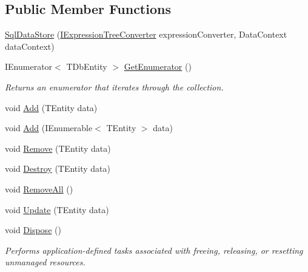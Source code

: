 \subsection*{Public Member Functions}
\begin{DoxyCompactItemize}
\item 
\hyperlink{classCqrs_1_1Sql_1_1DataStores_1_1SqlDataStore_a3ddc911126acbde0353e7773ddfa8acc}{Sql\+Data\+Store} (\hyperlink{interfaceCqrs_1_1Sql_1_1DataStores_1_1IExpressionTreeConverter}{I\+Expression\+Tree\+Converter} expression\+Converter, Data\+Context data\+Context)
\item 
I\+Enumerator$<$ T\+Db\+Entity $>$ \hyperlink{classCqrs_1_1Sql_1_1DataStores_1_1SqlDataStore_a2114238ed13dfe1beaf1b096d3e36c6a}{Get\+Enumerator} ()
\begin{DoxyCompactList}\small\item\em Returns an enumerator that iterates through the collection. \end{DoxyCompactList}\item 
void \hyperlink{classCqrs_1_1Sql_1_1DataStores_1_1SqlDataStore_a715ab041546e864cb9551d165c240f33}{Add} (T\+Entity data)
\item 
void \hyperlink{classCqrs_1_1Sql_1_1DataStores_1_1SqlDataStore_a510fc3eafe64f999b99290cd8924a00e}{Add} (I\+Enumerable$<$ T\+Entity $>$ data)
\item 
void \hyperlink{classCqrs_1_1Sql_1_1DataStores_1_1SqlDataStore_ada15bdc873b3e4be8ff9a734d84562fb}{Remove} (T\+Entity data)
\item 
void \hyperlink{classCqrs_1_1Sql_1_1DataStores_1_1SqlDataStore_a5065ed1d4b5c66324afcde4acc68ad6b}{Destroy} (T\+Entity data)
\item 
void \hyperlink{classCqrs_1_1Sql_1_1DataStores_1_1SqlDataStore_a5d85a9e627c74a25ef536364a6d60602}{Remove\+All} ()
\item 
void \hyperlink{classCqrs_1_1Sql_1_1DataStores_1_1SqlDataStore_a5cc26a4d03036f93b5942ff2e04afd2d}{Update} (T\+Entity data)
\item 
void \hyperlink{classCqrs_1_1Sql_1_1DataStores_1_1SqlDataStore_ac142d009f768519891ca12185a2e6191}{Dispose} ()
\begin{DoxyCompactList}\small\item\em Performs application-\/defined tasks associated with freeing, releasing, or resetting unmanaged resources. \end{DoxyCompactList}\end{DoxyCompactItemize}
